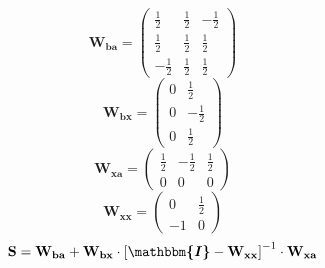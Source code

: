 \documentclass[10pt]{article} \usepackage{amsmath} \usepackage{bbold}
\begin{document}
\[ \mathbf{W_{ba}} = \left(\begin{smallmatrix} \frac{1}{2} &
\frac{1}{2} & -\frac{1}{2} \\ \frac{1}{2} & \frac{1}{2} & \frac{1}{2}
\\ -\frac{1}{2} & \frac{1}{2} & \frac{1}{2} \end{smallmatrix}\right)
\]
\[ \mathbf{W_{bx}} = \left(\begin{smallmatrix} 0 & \frac{1}{2} \\ 0 &
-\frac{1}{2} \\ 0 & \frac{1}{2} \end{smallmatrix}\right) \]
\[ \mathbf{W_{xa}} = \left(\begin{smallmatrix} \frac{1}{2} &
-\frac{1}{2} & \frac{1}{2} \\ 0 & 0 & 0 \end{smallmatrix}\right) \]
\[ \mathbf{W_{xx}} = \left(\begin{smallmatrix} 0 & \frac{1}{2} \\ -1 &
0 \end{smallmatrix}\right) \]
\[ \mathbf{S}=\mathbf{W_{ba}}+\mathbf{W_{bx}}\cdot\left[
\boldsymbol{\mathbbm{I}}
-\mathbf{W_{xx}}\right]^{-1}\cdot\mathbf{W_{xa}} \]
\end{document}
